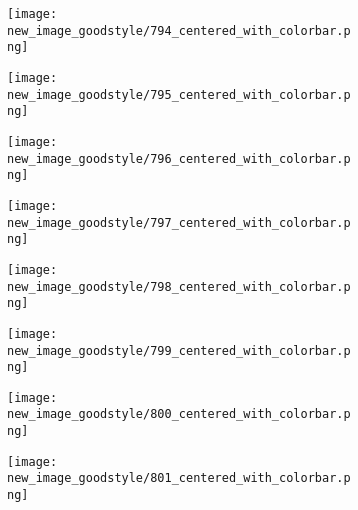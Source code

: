 \documentclass[a4paper,12pt]{article}
\begin{document}
\begin{figure}[H]
  \begin{subfigure}{0.11\textwidth}
    \texttt{[image: new\_image\_goodstyle/794\_centered\_with\_colorbar.png]}
  \end{subfigure}
  \hfill
  \begin{subfigure}{0.11\textwidth}
    \texttt{[image: new\_image\_goodstyle/795\_centered\_with\_colorbar.png]}
  \end{subfigure}
  \hfill
  \begin{subfigure}{0.11\textwidth}
    \texttt{[image: new\_image\_goodstyle/796\_centered\_with\_colorbar.png]}
  \end{subfigure}
  \hfill
  \begin{subfigure}{0.11\textwidth}
    \texttt{[image: new\_image\_goodstyle/797\_centered\_with\_colorbar.png]}
  \end{subfigure}
  \hfill
  \begin{subfigure}{0.11\textwidth}
    \texttt{[image: new\_image\_goodstyle/798\_centered\_with\_colorbar.png]}
  \end{subfigure}
  \hfill
  \begin{subfigure}{0.11\textwidth}
    \texttt{[image: new\_image\_goodstyle/799\_centered\_with\_colorbar.png]}
  \end{subfigure}
  \hfill
  \begin{subfigure}{0.11\textwidth}
    \texttt{[image: new\_image\_goodstyle/800\_centered\_with\_colorbar.png]}
  \end{subfigure}
  \hfill
  \begin{subfigure}{0.11\textwidth}
    \texttt{[image: new\_image\_goodstyle/801\_centered\_with\_colorbar.png]}
  \end{subfigure}
  \hfill
\end{figure}
\end{document}
